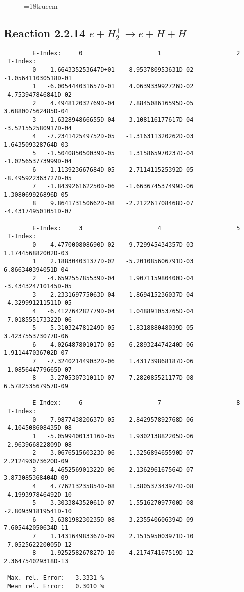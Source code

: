 \begin{figure} \label{2.2.12}
\epsfxsize=18truecm
\end{figure}
\newpage



\subsection{
Reaction 2.2.14  $ e + H_2^+    \rightarrow e + H + H  $
}



\begin{verbatim}
        E-Index:     0                     1                     2
 T-Index:
        0   -1.664335253647D+01    8.953780953631D-02   -1.056411030518D-01
        1   -6.005444031657D-01    4.063933992726D-02   -4.753947846841D-02
        2    4.494812032769D-04    7.884508616595D-05    3.688007562485D-04
        3    1.632894866655D-04    3.108116177617D-04   -3.521552580917D-04
        4   -7.234142549752D-05   -1.316311320262D-03    1.643509328764D-03
        5   -1.504085050039D-05    1.315865970237D-04   -1.025653773999D-04
        6    1.113923667684D-05    2.711411525392D-05   -8.495922363727D-05
        7   -1.843926162250D-06   -1.663674537499D-06    1.308069926896D-05
        8    9.864173150662D-08   -2.212261708468D-07   -4.431749501051D-07

        E-Index:     3                     4                     5
 T-Index:
        0    4.477000808690D-02   -9.729945434357D-03    1.174456882002D-03
        1    2.188304031377D-02   -5.201085606791D-03    6.866340394051D-04
        2   -4.659255785539D-04    1.907115980400D-04   -3.434324710145D-05
        3   -2.233169775063D-04    1.869415236037D-04   -4.329991211511D-05
        4   -6.412764282779D-04    1.048891053765D-04   -7.018555173322D-06
        5    5.310324781249D-05   -1.831888048039D-05    3.423755373077D-06
        6    4.026487801017D-05   -6.289324474240D-06    1.911447036702D-07
        7   -7.324021449032D-06    1.431739868187D-06   -1.085644779665D-07
        8    3.270530731011D-07   -7.282085521177D-08    6.578253567957D-09

        E-Index:     6                     7                     8
 T-Index:
        0   -7.987743820637D-05    2.842957892768D-06   -4.104508608435D-08
        1   -5.059940013116D-05    1.930213882205D-06   -2.963966822809D-08
        2    3.067651560323D-06   -1.325689465590D-07    2.212493073620D-09
        3    4.465256901322D-06   -2.136296167564D-07    3.873085368404D-09
        4    4.776213235854D-08    1.380537343974D-08   -4.199397846492D-10
        5   -3.303384352061D-07    1.551627097700D-08   -2.809391819541D-10
        6    3.638198230235D-08   -3.235540606394D-09    7.605442050634D-11
        7    1.143164983367D-09    2.151595003971D-10   -7.052562220005D-12
        8   -1.925258267827D-10   -4.217474167519D-12    2.364754029318D-13

 Max. rel. Error:   3.3331 %
 Mean rel. Error:   0.3010 %


\end{verbatim}
